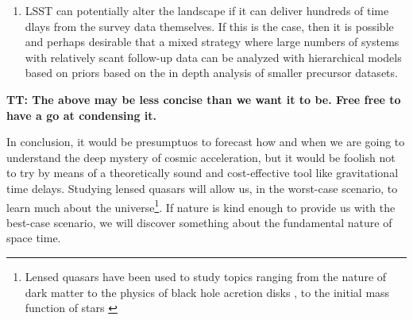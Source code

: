 \begin{enumerate}
\item LSST can potentially alter the landscape if it can deliver hundreds of time dlays from the survey data themselves. If this is the case, then it is possible and perhaps desirable that a mixed strategy where large numbers of systems with relatively scant follow-up data can be analyzed with hierarchical models based on priors based on the in depth analysis of smaller precursor datasets.
\end{enumerate}

\textbf{TT: The above may be less concise than we want it to be. Free free to have a go at condensing it.}

In conclusion, it would be presumptuos to forecast how and when we are
going to understand the deep mystery of cosmic acceleration, but it
would be foolish not to try by means of a theoretically sound and
cost-effective tool like gravitational time delays. Studying lensed
quasars will allow us, in the worst-case scenario, to learn much about
the universe\footnote{Lensed quasars have been used to study topics ranging from the nature of dark matter
\citep{Metcalf:2005p1203,Xu++09,Veg++14,Nie++14} to the physics of
black hole acretion disks \citep{PMK08,Blackburne:2010p6600}, to the
initial mass function of stars \citep{SCH++15}}. If nature is kind
enough to provide us with the best-case scenario, we will discover
something about the fundamental nature of space time.

